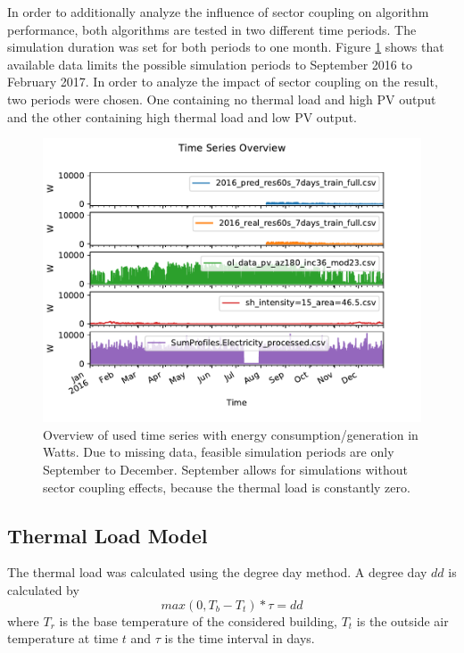 \documentclass[a4paper,12pt]{book}
\theoremstyle{break}
\begin{document}
In order to additionally analyze the influence of sector coupling on algorithm performance, both algorithms are tested in two different time periods.
The simulation duration was set for both periods to one month. Figure \ref{f/meth/ts/overview} shows that available data limits the possible simulation periods to September 2016 to February 2017.
In order to analyze the impact of sector coupling on the result, two periods were chosen. One containing no thermal load and high \ac{PV} output and the other containing high thermal load and low \ac{PV} output.

\begin{figure}[htp]
	\centering
	\includegraphics[width=\textwidth]{overview}
	\caption{Overview of used time series with energy consumption/generation in Watts. Due to missing data, feasible simulation periods are only September to December. September allows for simulations without sector coupling effects, because the thermal load is constantly zero.}
	\label{f/meth/ts/overview}
\end{figure}

\subsection{Thermal Load Model}\label{s/meth/thermal}
The thermal load was calculated using the degree day method.
A degree day $dd$ is  calculated by
\begin{equation}
	max(0, T_b - T_t) * \tau = dd
\end{equation}
where $T_r$ is the base temperature of the considered building, $T_t$ is the outside air temperature at time $t$ and $\tau$ is the time interval in days.
\end{document}
